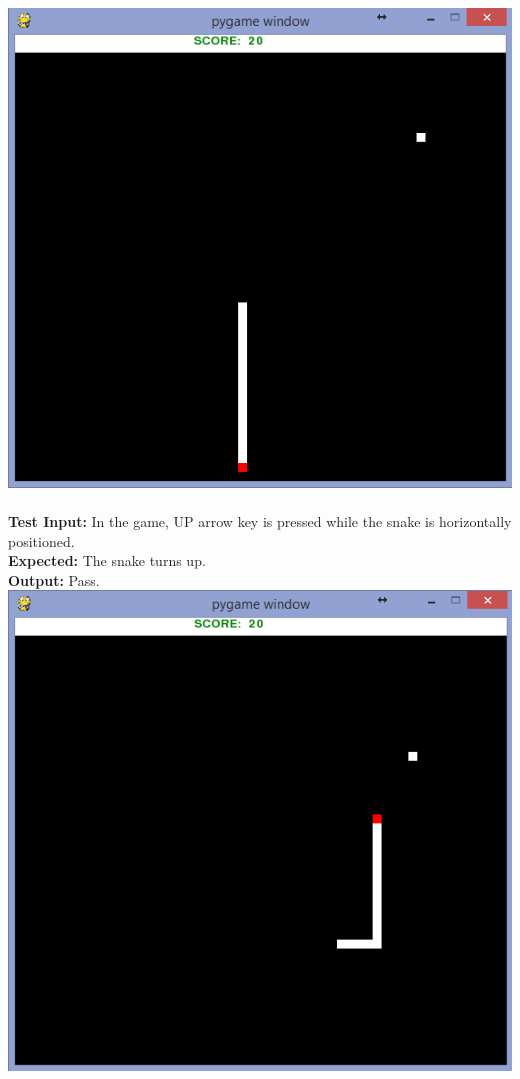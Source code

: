 \documentclass[12pt]{article}
\begin{document}
\includegraphics[width=\textwidth]{startgame.png}\\
\\
\textbf{Test Input:} In the game, UP arrow key is pressed while the snake is horizontally positioned.\\
\textbf{Expected:} The snake turns up.\\
\textbf{Output:} Pass.\\
\pagebreak
\includegraphics[width=\textwidth]{snakeup.png}
\end{document}
